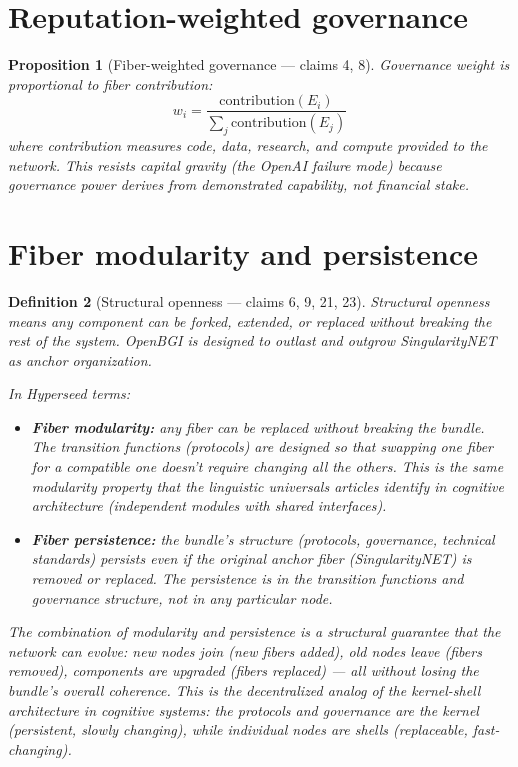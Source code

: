\documentclass[11pt,a4paper]{article}
\newtheorem{definition}{Definition}[section]
\newtheorem{proposition}[definition]{Proposition}
\begin{document}
\section{Reputation-weighted governance}

\begin{proposition}[Fiber-weighted governance --- claims 4, 8]
\label{prop:governance}
Governance weight is proportional to fiber contribution:
\[
  w_i = \frac{\text{contribution}(E_i)}{\sum_j \text{contribution}(E_j)}
\]
where contribution measures code, data, research, and compute provided
to the network. This resists capital gravity (the OpenAI failure mode)
because governance power derives from demonstrated capability, not
financial stake.
\end{proposition}


\section{Fiber modularity and persistence}
\label{sec:modularity}

\begin{definition}[Structural openness --- claims 6, 9, 21, 23]
\label{def:modularity}
Structural openness means any component can be forked, extended, or
replaced without breaking the rest of the system. OpenBGI is designed
to outlast and outgrow SingularityNET as anchor organization.

In Hyperseed terms:
\begin{itemize}
\item \textbf{Fiber modularity:} any fiber can be replaced without
  breaking the bundle. The transition functions (protocols) are
  designed so that swapping one fiber for a compatible one doesn't
  require changing all the others. This is the same modularity
  property that the linguistic universals articles identify in
  cognitive architecture (independent modules with shared interfaces).

\item \textbf{Fiber persistence:} the bundle's structure (protocols,
  governance, technical standards) persists even if the original
  anchor fiber (SingularityNET) is removed or replaced. The persistence
  is in the transition functions and governance structure, not in any
  particular node.
\end{itemize}

The combination of modularity and persistence is a structural guarantee
that the network can evolve: new nodes join (new fibers added), old
nodes leave (fibers removed), components are upgraded (fibers replaced)
--- all without losing the bundle's overall coherence. This is the
decentralized analog of the kernel-shell architecture in cognitive
systems: the protocols and governance are the kernel (persistent,
slowly changing), while individual nodes are shells (replaceable,
fast-changing).
\end{definition}
\end{document}
